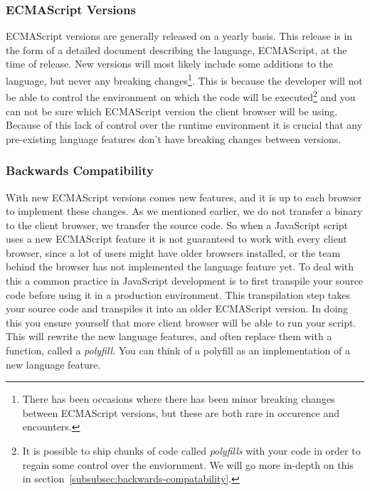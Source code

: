 \subsubsection{ECMAScript Versions}

ECMAScript versions are generally released on a yearly basis.
This release is in the form of a detailed document describing the language, ECMAScript, at the time of release.
New versions will most likely include some additions to the language, but never any breaking changes\footnote{There has been occasions where there has been minor breaking changes between ECMAScript versions, but these are both rare in occurence and encounters.}.
This is because the developer will not be able to control the environment on which the code will be executed\footnote{It is possible to ship chunks of code called \textit{polyfills} with your code in order to regain some control over the enviornment. We will go more in-depth on this in section~\vref{subsubsec:backwards-compatability}.} and you can not be sure which ECMAScript version the client browser will be using.
Because of this lack of control over the runtime environment it is crucial that any pre-existing language features don't have breaking changes between versions.

\subsubsection{Backwards Compatibility}\label{subsubsec:backwards-compatability}

With new ECMAScript versions comes new features, and it is up to each browser to implement these changes.
As we mentioned earlier, we do not transfer a binary to the client browser, we transfer the source code.
So when a JavaScript script uses a new ECMAScript feature it is not guaranteed to work with every client browser, since a lot of users might have older browsers installed, or the team behind the browser has not implemented the language feature yet.
To deal with this a common practice in JavaScript development is to first transpile your source code before using it in a production environment.
This transpilation step takes your source code and transpiles it into an older ECMAScript version.
In doing this you ensure yourself that more client browser will be able to run your script.
This will rewrite the new language features, and often replace them with a function, called a \textit{polyfill}.
You can think of a polyfill as an implementation of a new language feature.

